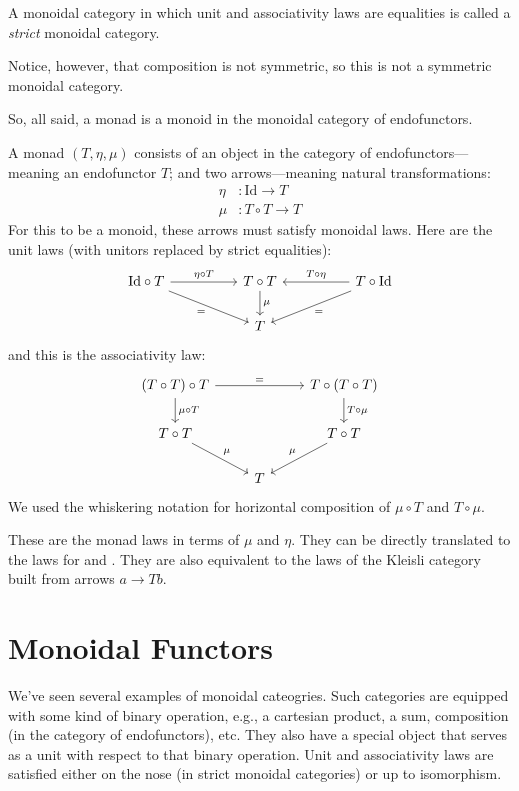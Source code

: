 \documentclass[DaoFP]{subfiles}
\begin{document}
A monoidal category in which unit and associativity laws are equalities is called a \emph{strict} monoidal category.

Notice, however, that composition is not symmetric, so this is not a symmetric monoidal category.

So, all said, a monad is a monoid in the monoidal category of endofunctors. 

A monad $(T, \eta, \mu)$ consists of an object in the category of endofunctors---meaning an endofunctor $T$; and two arrows---meaning natural transformations:
\begin{align*}
 \eta &\colon \text{Id} \to T \\
 \mu &\colon T \circ T \to T 
\end{align*}
For this to be a monoid, these arrows must satisfy monoidal laws. Here are the unit laws (with unitors replaced by strict equalities):
\[
 \begin{tikzcd}
\text{Id} \circ T
 \arrow[rr, "\eta \circ T"]
 \arrow[rrd, "="']
& & T \circ T
 \arrow[d, "\mu"]
&& T \circ \text{Id}
 \arrow[ll, "T \circ \eta"']
 \arrow[lld, "="]
 \\
 && T
  \end{tikzcd}
\]
and this is the associativity law:
\[
 \begin{tikzcd}
 (T \circ T) \circ T 
 \arrow[rr, "="]
 \arrow[d, "\mu \circ T"]
 &&
 T \circ (T \circ T)
 \arrow[d, "T \circ \mu"]
 \\
 T \circ T 
 \arrow[dr, "\mu"]
& & T \circ T
 \arrow[dl, "\mu"']
 \\
&  T
 \end{tikzcd}
\]
We used the whiskering notation for horizontal composition of $\mu \circ T$ and $T \circ \mu$.

These are the monad laws in terms of $\mu$ and $\eta$. They can be directly translated to the laws for  and . They are also equivalent to the laws of the Kleisli category built from arrows $a \to T b$.

\section{Monoidal Functors}

We've seen several examples of monoidal cateogries. Such categories are equipped with some kind of binary operation, e.g., a cartesian product, a sum, composition (in the category of endofunctors), etc. They also have a special object that serves as a unit with respect to that binary operation. Unit and associativity laws are satisfied either on the nose (in strict monoidal categories) or up to isomorphism.
\end{document}

